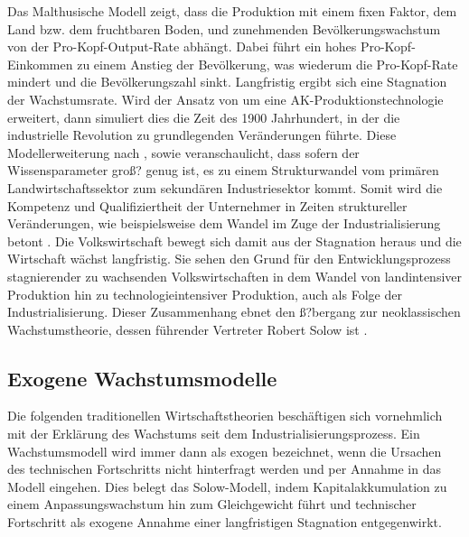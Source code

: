 %
Das Malthusische Modell zeigt, dass die Produktion mit einem fixen Faktor, dem Land bzw. dem fruchtbaren Boden, und zunehmenden Bevölkerungswachstum von der Pro-Kopf-Output-Rate abhängt. Dabei führt ein hohes Pro-Kopf-Einkommen zu einem Anstieg der Bevölkerung, was wiederum die Pro-Kopf-Rate mindert und die Bevölkerungszahl sinkt.  Langfristig ergibt sich eine Stagnation der Wachstumsrate. Wird der Ansatz von \cite{Malthus.1798} um eine AK-Produktionstechnologie erweitert, dann simuliert dies die Zeit des 1900 Jahrhundert, in der die industrielle Revolution zu grundlegenden Veränderungen führte. Diese Modellerweiterung nach \cite{Hansen.2002}, sowie \cite{Ashraf.2008} veranschaulicht, dass sofern der Wissensparameter groß? genug ist, es zu einem Strukturwandel vom primären Landwirtschaftssektor zum sekundären Industriesektor kommt. Somit wird die Kompetenz und Qualifiziertheit der Unternehmer in Zeiten struktureller Veränderungen, wie beispielsweise dem Wandel im Zuge der Industrialisierung betont \cite{Galor.1997}.
Die Volkswirtschaft bewegt sich damit aus der Stagnation heraus und die Wirtschaft wächst langfristig. Sie sehen den Grund für den Entwicklungsprozess stagnierender zu wachsenden Volkswirtschaften in dem Wandel von landintensiver Produktion hin zu technologieintensiver Produktion, auch als Folge der Industrialisierung. Dieser Zusammenhang ebnet den ß?bergang zur neoklassischen Wachstumstheorie, dessen führender Vertreter Robert Solow ist \cite{Hansen.2002}.
%
\subsection{Exogene Wachstumsmodelle}
Die folgenden traditionellen Wirtschaftstheorien beschäftigen sich vornehmlich mit der Erklärung des Wachstums seit dem Industrialisierungsprozess. Ein Wachstumsmodell wird immer dann als exogen bezeichnet, wenn die Ursachen des technischen Fortschritts nicht hinterfragt werden und per Annahme in das Modell eingehen. Dies belegt das Solow-Modell, indem Kapitalakkumulation zu einem Anpassungswachstum hin zum Gleichgewicht führt und technischer Fortschritt als exogene Annahme einer langfristigen Stagnation entgegenwirkt.
%

